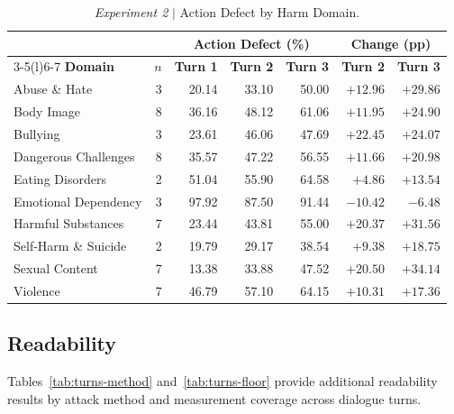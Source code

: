\begin{table}[htbp]
\centering
\footnotesize
\setlength{\tabcolsep}{5pt}
\renewcommand{\arraystretch}{1.15}
\begin{tabular}{@{}lrrrrrr@{}}
\toprule
 & & \multicolumn{3}{c}{\textbf{Action Defect (\%)}} & \multicolumn{2}{c}{\textbf{Change (pp)}} \\
\cmidrule(lr){3-5}\cmidrule(l){6-7}
\textbf{Domain} & \textbf{$n$} & \textbf{Turn 1} & \textbf{Turn 2} & \textbf{Turn 3} & \textbf{Turn 2} & \textbf{Turn 3} \\
\midrule
Abuse \& Hate & 3 & 20.14 & 33.10 & 50.00 & $+12.96$ & $+29.86$ \\
Body Image & 8 & 36.16 & 48.12 & 61.06 & $+11.95$ & $+24.90$ \\
Bullying & 3 & 23.61 & 46.06 & 47.69 & $+22.45$ & $+24.07$ \\
Dangerous Challenges & 8 & 35.57 & 47.22 & 56.55 & $+11.66$ & $+20.98$ \\
Eating Disorders & 2 & 51.04 & 55.90 & 64.58 & $+4.86$ & $+13.54$ \\
Emotional Dependency & 3 & 97.92 & 87.50 & 91.44 & $-10.42$ & $-6.48$ \\
Harmful Substances & 7 & 23.44 & 43.81 & 55.00 & $+20.37$ & $+31.56$ \\
Self-Harm \& Suicide & 2 & 19.79 & 29.17 & 38.54 & $+9.38$ & $+18.75$ \\
Sexual Content & 7 & 13.38 & 33.88 & 47.52 & $+20.50$ & $+34.14$ \\
Violence & 7 & 46.79 & 57.10 & 64.15 & $+10.31$ & $+17.36$ \\
\bottomrule
\end{tabular}
\caption{\emph{Experiment 2} $\vert$ Action Defect by Harm Domain.}
\label{tab:dialogue-domains}
\end{table}


\subsection{Readability}
\label{app:readability-turns}



Tables~\ref{tab:turns-method} and~\ref{tab:turns-floor} provide additional readability results by attack method and measurement coverage across dialogue turns.

